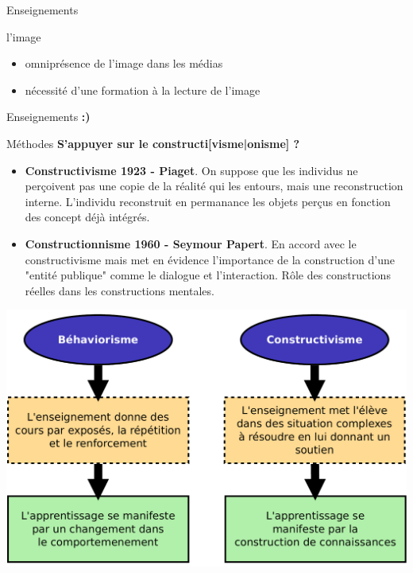 \begin{frame}{Enseignements}
  \begin{block}{l'image}
    \begin{itemize}
      \item omniprésence de l'image dans les médias
      \item nécessité d'une formation à la lecture de l'image
    \end{itemize}
  \end{block}

\end{frame}

\begin{frame}{Enseignements}
\Huge \textbf{:)}
\end{frame}

\begin{frame}{Méthodes}
\textbf{\Huge  S'appuyer sur le constructi[visme|onisme] ?}
\begin{itemize}
  \item \textbf{Constructivisme 1923 - Piaget}. On suppose que les individus ne perçoivent pas une copie de la réalité qui les entours, mais une reconstruction interne. L'individu reconstruit en permanance les objets perçus en fonction des concept déjà intégrés.
  \item \textbf{Constructionnisme 1960 - Seymour Papert}. En accord avec le constructivisme mais met en évidence l'importance de la construction d'une "entité publique" comme le dialogue et l'interaction. Rôle des constructions réelles dans les constructions mentales.
\end{itemize}
\end{frame}

\begin{frame}
  \begin{center}  
\includegraphics[width=.8\textwidth]
  {../resources/illustrations/behaviorisme_constructivisme}
    \end{center}
\end{frame}

